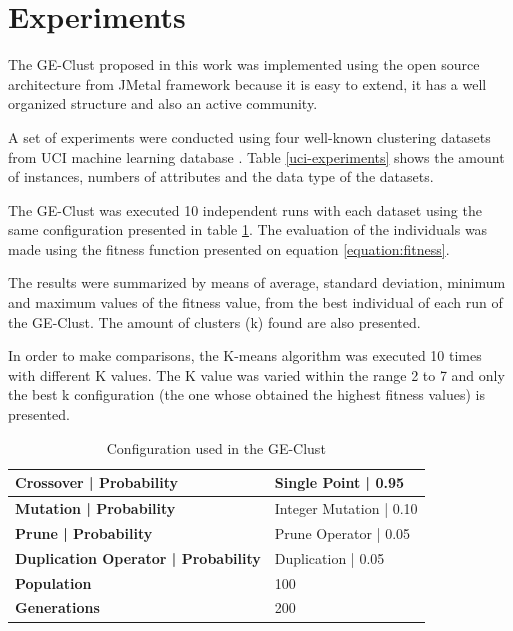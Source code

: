 \documentclass[journal]{IEEEtran}
\begin{document}
	\section{Experiments} \label{sec:experiments}
	
	The GE-Clust proposed in this work was implemented using the open source architecture from JMetal framework \cite{jMetal} because it is easy to extend, it has a well organized structure and also an active community.  
	
	A set of experiments were conducted using  four well-known clustering datasets from UCI machine learning database \cite{uci}. Table \ref{uci-experiments} shows the amount of instances, numbers of attributes and the data type of the datasets. 
	
	
	The GE-Clust was executed 10 independent runs with each dataset using the same configuration presented in table \ref{ge-configuration}. The evaluation of the individuals was made using the fitness function presented on equation \ref{equation:fitness}.
	
	
	The results were summarized by means of average, standard deviation, minimum and maximum values of the fitness value,  from the best individual of each run of the GE-Clust. The amount of clusters (k) found are also presented.
	
	
	In order to make comparisons, the K-means algorithm was executed 10 times with different K values. The K value was varied within the range 2 to 7 and only the best k configuration (the one whose obtained the highest fitness values) is presented. 
	
	\begin{table}[]
		\centering
		\caption{Configuration used in the GE-Clust}
		\label{ge-configuration}
		\begin{tabular}{|l|l|}
			\hline
			\textbf{Crossover  |  Probability}         & Single Point  | 0.95     \\ \hline
			\textbf{Mutation | Probability}            & Integer Mutation          |  0.10 \\ \hline
			\textbf{Prune  | Probability}      & Prune Operator           | 0.05   \\ \hline
			\textbf{Duplication Operator | Probability} & Duplication   | 0.05     \\ \hline
			\textbf{Population}                        & 100                               \\ \hline
			\textbf{Generations}                       & 200                               \\ \hline
		\end{tabular}
	\end{table}
	
\end{document}
